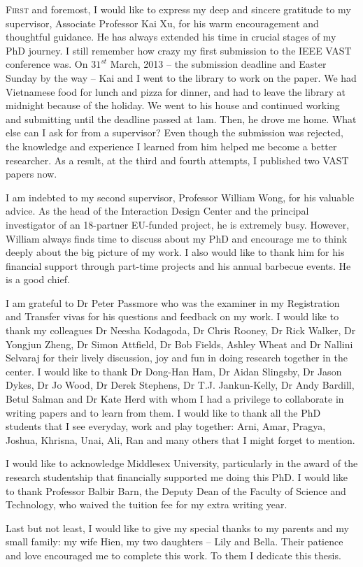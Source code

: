 
\begin{acknowledgements}      
\lettrine{F}{irst} and foremost, I would like to express my deep and sincere gratitude to my supervisor, Associate Professor Kai Xu, for his warm encouragement and thoughtful guidance. He has always extended his time in crucial stages of my PhD journey. I still remember how crazy my first submission to the IEEE VAST conference was. On $31^{st}$ March, 2013 -- the submission deadline and Easter Sunday by the way -- Kai and I went to the library to work on the paper. We had Vietnamese food for lunch and pizza for dinner, and had to leave the library at midnight because of the holiday. We went to his house and continued working and submitting until the deadline passed at 1am. Then, he drove me home. What else can I ask for from a supervisor? Even though the submission was rejected, the knowledge and experience I learned from him helped me become a better researcher. As a result, at the third and fourth attempts, I published two VAST papers now.

I am indebted to my second supervisor, Professor William Wong, for his valuable advice. As the head of the Interaction Design Center and the principal investigator of an 18-partner EU-funded project, he is extremely busy. However, William always finds time to discuss about my PhD and encourage me to think deeply about the big picture of my work. I also would like to thank him for his financial support through part-time projects and his annual barbecue events. He is a good chief.

I am grateful to Dr Peter Passmore who was the examiner in my Registration and Transfer vivas for his questions and feedback on my work. I would like to thank my colleagues Dr Neesha Kodagoda, Dr Chris Rooney, Dr Rick Walker, Dr Yongjun Zheng, Dr Simon Attfield, Dr Bob Fields, Ashley Wheat and Dr Nallini Selvaraj for their lively discussion, joy and fun in doing research together in the center. I would like to thank Dr Dong-Han Ham, Dr Aidan Slingsby, Dr Jason Dykes, Dr Jo Wood, Dr Derek Stephens, Dr T.J. Jankun-Kelly, Dr Andy Bardill,  Betul Salman and Dr Kate Herd with whom I had a privilege to collaborate in writing papers and to learn from them. I would like to thank all the PhD students that I see everyday, work and play together: Arni, Amar, Pragya, Joshua, Khrisna, Unai, Ali, Ran and many others that I might forget to mention.

I would like to acknowledge Middlesex University, particularly in the award of the research studentship that financially supported me doing this PhD. I would like to thank Professor Balbir Barn, the Deputy Dean of the Faculty of Science and Technology, who waived the tuition fee for my extra writing year.

Last but not least, I would like to give my special thanks to my parents and my small family: my wife Hien, my two daughters -- Lily and Bella. Their patience and love encouraged me to complete this work. To them I dedicate this thesis.

\end{acknowledgements}

